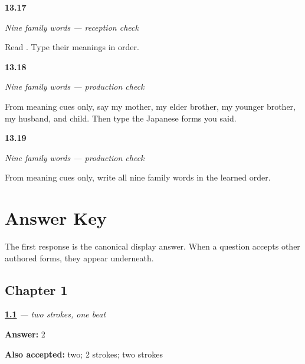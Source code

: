 \noindent\begin{minipage}[t]{\linewidth}
\raggedright
\hypertarget{review-JA-C13-family-reception-reading}{\textbf{13.17}} \emph{Nine family words — reception check}\par
\small Read . Type their meanings in order.
\end{minipage}\par\medskip

\noindent\begin{minipage}[t]{\linewidth}
\raggedright
\hypertarget{review-JA-C13-family-check-speaking}{\textbf{13.18}} \emph{Nine family words — production check}\par
\small From meaning cues only, say my mother, my elder brother, my younger brother, my husband, and child. Then type the Japanese forms you said.
\end{minipage}\par\medskip

\noindent\begin{minipage}[t]{\linewidth}
\raggedright
\hypertarget{review-JA-C13-family-check-writing}{\textbf{13.19}} \emph{Nine family words — production check}\par
\small From meaning cues only, write all nine family words in the learned order.
\end{minipage}\par\medskip

\chapter*{Answer Key}

The first response is the canonical display answer. When a question accepts other authored forms, they appear underneath.

\section*{Chapter 1}

\noindent\begin{minipage}[t]{\linewidth}
\raggedright
\hyperlink{review-JA-W01-i-strokes}{\textbf{1.1}} \emph{ — two strokes, one beat}\par
\small \textbf{Answer:} 2\par
\footnotesize \textbf{Also accepted:} two; 2 strokes; two strokes
\end{minipage}\par\medskip

